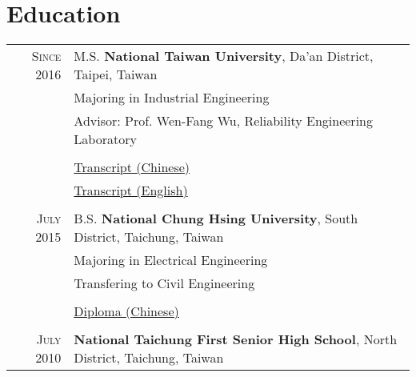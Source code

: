 \documentclass[a4paper,10pt]{article}
\begin{document}
\section{Education}
\begin{tabular}{rl} 
\textsc{Since} 2016 & M.S. \textbf{National Taiwan University}, Da’an District, Taipei, Taiwan              \\
                    & Majoring in Industrial Engineering                                                    \\
                    & Advisor: Prof. Wen-Fang Wu, Reliability Engineering Laboratory                        \\
                    &                                                                                       \\
                    & \hfill \href{https://goo.gl/9LySp5}{\footnotesize Transcript (Chinese)}               \\
                    & \hfill \href{https://goo.gl/7kHMC8}{\footnotesize Transcript (English)}               \\
                    &                                                                                       \\

\textsc{July} 2015  & B.S. \textbf{National Chung Hsing University}, South District, Taichung, Taiwan       \\
                    & \textcolor[RGB]{200, 200, 200}{Majoring in Electrical Engineering}                    \\
                    & Transfering to Civil Engineering                                                      \\
                    &                                                                                       \\
                    & \hfill \href{https://goo.gl/zrmbVD}{\footnotesize Diploma (Chinese)}                  \\
                    &                                                                                       \\

\textsc{July} 2010 & \textbf{National Taichung First Senior High School}, North District, Taichung, Taiwan
\end{tabular}
\end{document}
